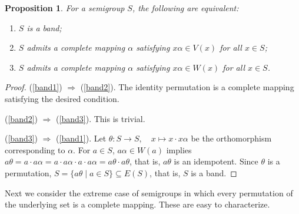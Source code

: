 \documentclass[11pt]{article}
\theoremstyle{plain}
\newtheorem{prop}[theorem]{Proposition}
\theoremstyle{remark}
\theoremstyle{definition}
\theoremstyle{plain}
\begin{document}
\begin{prop}\label{Prp:weakinv_band}
For a semigroup $S$, the following are equivalent:
\begin{enumerate}
    \item\label{band1} $S$ is a band;
    \item\label{band2} $S$ admits a complete mapping $\alpha$ satisfying $x\alpha\in V(x)$ for all $x\in S$;
    \item\label{band3} $S$ admits a complete mapping $\alpha$ satisfying $x\alpha\in W(x)$ for all $x\in S$.
\end{enumerate}
\end{prop}
\begin{proof}
    (\ref{band1}) $\Rightarrow$ (\ref{band2}). The identity permutation is a complete mapping satisfying the desired condition.

    \noindent (\ref{band2}) $\Rightarrow$ (\ref{band3}). This is trivial.

    \noindent (\ref{band3}) $\Rightarrow$ (\ref{band1}). Let $\theta\colon S\to S,\quad x\mapsto x\cdot x\alpha$ be the orthomorphism corresponding to $\alpha$. For $a\in S$, $a\alpha\in W(a)$
    implies $a\theta = a\cdot a\alpha = a\cdot a\alpha\cdot a\cdot a\alpha = a\theta\cdot a\theta$, that is, $a\theta$ is an idempotent. Since $\theta$ is a permutation, $S = \{a\theta\mid a\in S\}\subseteq E(S)$, that is, $S$ is a band.
\end{proof}

Next we consider the extreme case of semigroups in which every permutation of the underlying set is a complete mapping. These are easy to characterize.
\end{document}
